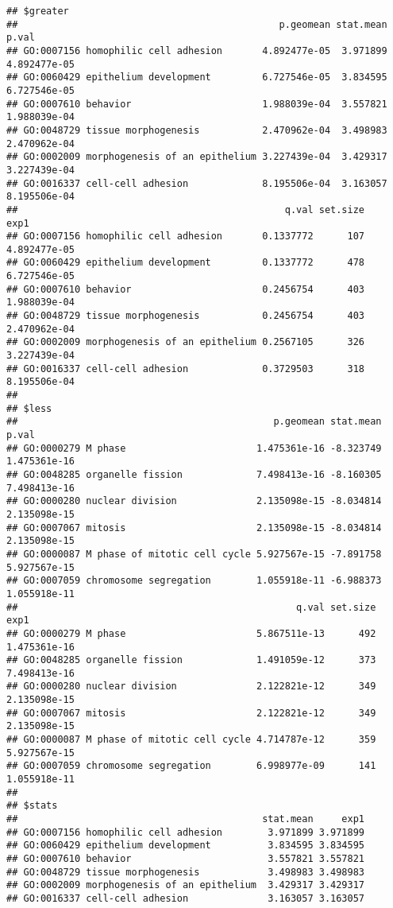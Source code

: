 \documentclass[
]{article}
\begin{document}
\begin{verbatim}
## $greater
##                                              p.geomean stat.mean        p.val
## GO:0007156 homophilic cell adhesion       4.892477e-05  3.971899 4.892477e-05
## GO:0060429 epithelium development         6.727546e-05  3.834595 6.727546e-05
## GO:0007610 behavior                       1.988039e-04  3.557821 1.988039e-04
## GO:0048729 tissue morphogenesis           2.470962e-04  3.498983 2.470962e-04
## GO:0002009 morphogenesis of an epithelium 3.227439e-04  3.429317 3.227439e-04
## GO:0016337 cell-cell adhesion             8.195506e-04  3.163057 8.195506e-04
##                                               q.val set.size         exp1
## GO:0007156 homophilic cell adhesion       0.1337772      107 4.892477e-05
## GO:0060429 epithelium development         0.1337772      478 6.727546e-05
## GO:0007610 behavior                       0.2456754      403 1.988039e-04
## GO:0048729 tissue morphogenesis           0.2456754      403 2.470962e-04
## GO:0002009 morphogenesis of an epithelium 0.2567105      326 3.227439e-04
## GO:0016337 cell-cell adhesion             0.3729503      318 8.195506e-04
## 
## $less
##                                             p.geomean stat.mean        p.val
## GO:0000279 M phase                       1.475361e-16 -8.323749 1.475361e-16
## GO:0048285 organelle fission             7.498413e-16 -8.160305 7.498413e-16
## GO:0000280 nuclear division              2.135098e-15 -8.034814 2.135098e-15
## GO:0007067 mitosis                       2.135098e-15 -8.034814 2.135098e-15
## GO:0000087 M phase of mitotic cell cycle 5.927567e-15 -7.891758 5.927567e-15
## GO:0007059 chromosome segregation        1.055918e-11 -6.988373 1.055918e-11
##                                                 q.val set.size         exp1
## GO:0000279 M phase                       5.867511e-13      492 1.475361e-16
## GO:0048285 organelle fission             1.491059e-12      373 7.498413e-16
## GO:0000280 nuclear division              2.122821e-12      349 2.135098e-15
## GO:0007067 mitosis                       2.122821e-12      349 2.135098e-15
## GO:0000087 M phase of mitotic cell cycle 4.714787e-12      359 5.927567e-15
## GO:0007059 chromosome segregation        6.998977e-09      141 1.055918e-11
## 
## $stats
##                                           stat.mean     exp1
## GO:0007156 homophilic cell adhesion        3.971899 3.971899
## GO:0060429 epithelium development          3.834595 3.834595
## GO:0007610 behavior                        3.557821 3.557821
## GO:0048729 tissue morphogenesis            3.498983 3.498983
## GO:0002009 morphogenesis of an epithelium  3.429317 3.429317
## GO:0016337 cell-cell adhesion              3.163057 3.163057
\end{verbatim}
\end{document}
